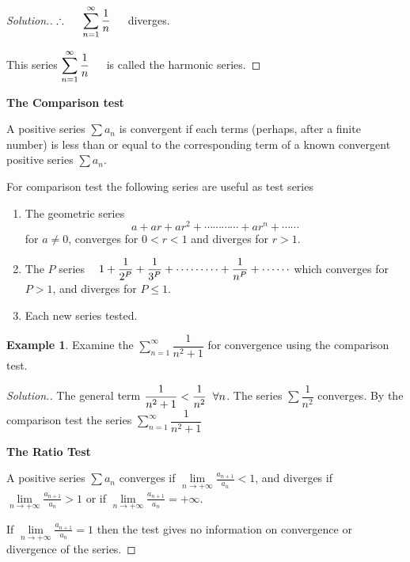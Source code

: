 \documentclass[11pt,a4paper]{article}
\theoremstyle{definition}
\newtheorem{exa}[thm]{Example}
\newenvironment{solution}
  {\renewcommand{\qedsymbol}{}\begin{proof}[\textit{Solution}.]}
  {\end{proof}}
\newcommand{\subhead}[1]{%
  \par\medskip\noindent\textbf{#1}\par\nobreak\smallskip}
\begin{document}
\begin{solution}
       $\therefore\hspace{0.5cm}\displaystyle{\sum^{\infty}_{n=1}\dfrac{1}{n}\hspace{0.4cm}}$ diverges.

      This series $\displaystyle{\sum^{\infty}_{n=1}\dfrac{1}{n}\hspace{0.4cm}}$ is called the harmonic series.
\end{solution}

\subhead{The Comparison test}

A positive series $\displaystyle{\sum a_n}$ is convergent if each terms (perhaps, after a finite number) is less than or equal to the corresponding term of a known convergent positive series $\displaystyle{\sum a_n}$.

For comparison test the following series are useful as test series
\begin{enumerate}
     \item The geometric series $$a + ar + ar^2 + \cdots\cdots\cdots\cdots + ar^n + \cdots\cdots$$ for $a\neq 0$, converges for $0< r<1$ and diverges for $r>1$.

     \item The $P$ series $\hspace{0.3cm}\displaystyle{1 + \dfrac{1}{2^P} + \dfrac{1}{3^P} + \cdots\cdots\cdots + \dfrac{1}{n^P}+\cdots\cdots}$ which converges for $P>1$, and diverges for $P\leq 1$.

     \item Each new series tested.
\end{enumerate}

\begin{exa}
Examine the $\displaystyle{\sum^{\infty}_{n = 1}\dfrac{1}{n^2 + 1}}$ for convergence using the comparison test.
\end{exa}

\begin{solution}
The general term $\dfrac{1}{n^2 + 1} < \dfrac{1}{n^2}\hspace{0.2cm} \forall n$. The series $\displaystyle{\sum \dfrac{1}{n^2}}$ converges. By the comparison test the series $\displaystyle{\sum^{\infty}_{n = 1}\dfrac{1}{n^2 + 1}}$

\subhead{The Ratio Test}

A positive series $\displaystyle{\sum a_n}$ converges if $\displaystyle{ \lim\limits_{n\rightarrow + \infty} \frac{a_{n + 1}}{a_n}< 1}$, and diverges if  $\displaystyle{ \lim\limits_{n\rightarrow + \infty} \frac{a_{n + 1}}{a_n}> 1}$ or if  $\displaystyle{ \lim\limits_{n\rightarrow + \infty} \frac{a_{n + 1}}{a_n} = + \infty}$.

If  $\displaystyle{ \lim\limits_{n\rightarrow + \infty} \frac{a_{n + 1}}{a_n}=1}$ then the test gives no information on convergence or divergence of the series.
\end{solution}
\end{document}
